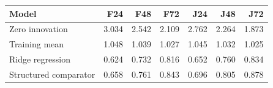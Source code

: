 \footnotesize\setlength{\tabcolsep}{3pt}\begin{tabular*}{\columnwidth}{@{\extracolsep{\fill}}lrrrrrr}
\toprule
Model & F24 & F48 & F72 & J24 & J48 & J72 \\
\midrule
Zero innovation & 3.034 & 2.542 & 2.109 & 2.762 & 2.264 & 1.873 \\
Training mean & 1.048 & 1.039 & 1.027 & 1.045 & 1.032 & 1.025 \\
Ridge regression & 0.624 & 0.732 & 0.816 & 0.652 & 0.760 & 0.834 \\
Structured comparator & 0.658 & 0.761 & 0.843 & 0.696 & 0.805 & 0.878 \\
\bottomrule
\end{tabular*}
